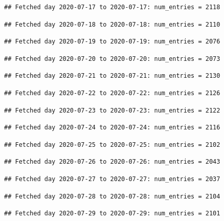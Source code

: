 \documentclass[]{article}
\begin{document}
\begin{verbatim}
## Fetched day 2020-07-17 to 2020-07-17: num_entries = 2118
\end{verbatim}

\begin{verbatim}
## Fetched day 2020-07-18 to 2020-07-18: num_entries = 2110
\end{verbatim}

\begin{verbatim}
## Fetched day 2020-07-19 to 2020-07-19: num_entries = 2076
\end{verbatim}

\begin{verbatim}
## Fetched day 2020-07-20 to 2020-07-20: num_entries = 2073
\end{verbatim}

\begin{verbatim}
## Fetched day 2020-07-21 to 2020-07-21: num_entries = 2130
\end{verbatim}

\begin{verbatim}
## Fetched day 2020-07-22 to 2020-07-22: num_entries = 2126
\end{verbatim}

\begin{verbatim}
## Fetched day 2020-07-23 to 2020-07-23: num_entries = 2122
\end{verbatim}

\begin{verbatim}
## Fetched day 2020-07-24 to 2020-07-24: num_entries = 2116
\end{verbatim}

\begin{verbatim}
## Fetched day 2020-07-25 to 2020-07-25: num_entries = 2102
\end{verbatim}

\begin{verbatim}
## Fetched day 2020-07-26 to 2020-07-26: num_entries = 2043
\end{verbatim}

\begin{verbatim}
## Fetched day 2020-07-27 to 2020-07-27: num_entries = 2037
\end{verbatim}

\begin{verbatim}
## Fetched day 2020-07-28 to 2020-07-28: num_entries = 2104
\end{verbatim}

\begin{verbatim}
## Fetched day 2020-07-29 to 2020-07-29: num_entries = 2101
\end{verbatim}
\end{document}
